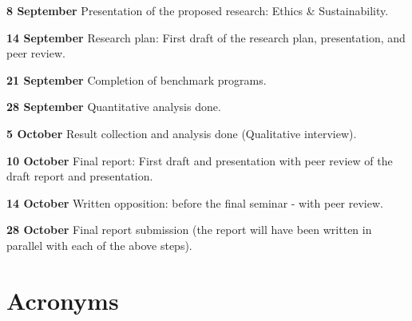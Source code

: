 \documentclass[12pt,twoside,english]{article}
\begin{document}
\begin{description}
\item{\textbf{8 September}} Presentation of the proposed research: Ethics \& Sustainability.

\item{\textbf{14 September}} Research plan: First draft of the research plan, presentation, and peer review.

\item{\textbf{21 September}} Completion of benchmark programs.

\item{\textbf{28 September}} Quantitative analysis done.

\item{\textbf{5 October}} Result collection and analysis done (Qualitative interview).

\item{\textbf{10 October}} Final report: First draft and presentation with peer review of the draft report and presentation.

\item{\textbf{14 October}} Written opposition: before the final seminar - with peer review.

\item{\textbf{28 October}} Final report submission (the report will have been written in parallel with each of the above steps).


\end{description}

\clearpage



\section{Acronyms}
\renewcommand{\glossarysection}[2][]{} %
\printglossary[type=\acronymtype,nonumberlist]
\clearpage
\end{document}
